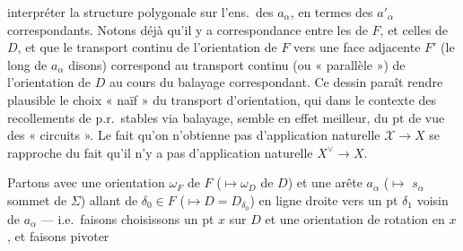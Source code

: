 \documentclass[11pt,a4paper]{article}
\begin{document}
interpréter la structure polygonale sur l'ens.\ des $a_\alpha$, en termes des $a'_\alpha$ correspondants. Notons déjà qu'il y a correspondance entre les   de $F$, et celles de $D$, et que le transport continu de l'orientation de $F$ vers une face adjacente $F'$ (le long de $a_\alpha$ disons) correspond au transport continu (ou « parallèle ») de l'orientation de $D$ au cours du balayage correspondant.  Ce dessin paraît rendre plausible le choix « naïf » du transport d'orientation, qui dans le contexte des recollements de p.r.\ stables via balayage, semble en effet meilleur, du pt de vue des « circuits ». Le fait qu'on n'obtienne pas d'application naturelle $\mathcal{X} \to X$ se rapproche du fait qu'il n'y a pas d'application naturelle $X^{\vee} \to X$.


Partons avec une orientation $\omega_F$ de $F$ ($\mapsto \omega_D$ de $D$) et une arête $a_\alpha$ ($\mapsto$ $s_\alpha$ sommet de $\Sigma$) allant de $\delta_0 \in F$ ($\mapsto D = D_{\delta_0}$) en ligne droite vers un pt $\delta_1$ voisin de $a_\alpha$ --- i.e.\ faisons  choisissons un pt $x$ sur $D$ et une orientation de rotation en $x$, et faisons pivoter
\end{document}
